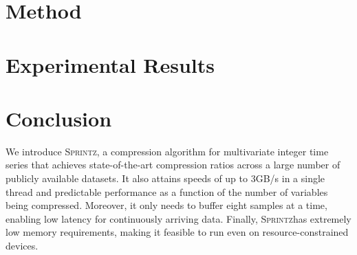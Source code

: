 \documentclass[acmlarge]{acmart}
\newcommand{\mine}{\textsc{Sprintz}}
\newcommand{\minesp}{\textsc{Sprintz}\text{ }}
\begin{document}


\section{Method} \label{sec:method}



\section{Experimental Results} \label{sec:results}




% 



\section{Conclusion} \label{sec:conclusion}

We introduce \mine, a compression algorithm for multivariate integer time series that achieves state-of-the-art compression ratios across a large number of publicly available datasets. It also attains speeds of up to 3GB/s in a single thread and predictable performance as a function of the number of variables being compressed. Moreover, it only needs to buffer eight samples at a time, enabling low latency for continuously arriving data. Finally, \minesp has extremely low memory requirements, making it feasible to run even on resource-constrained devices.
\end{document}
